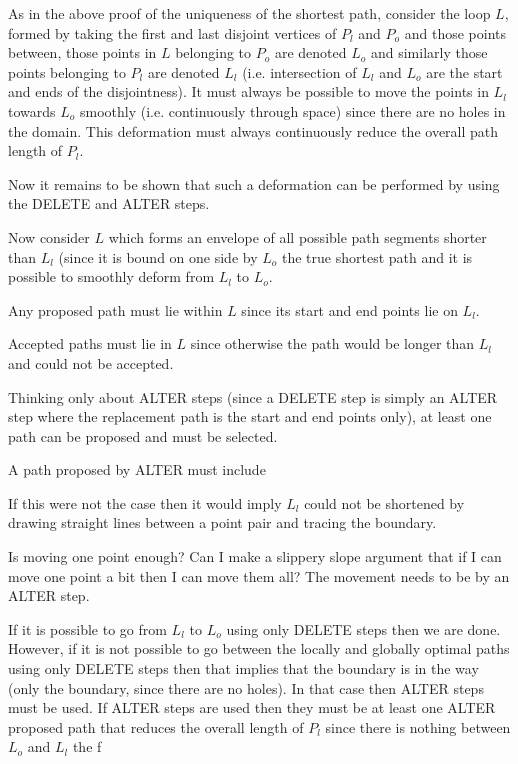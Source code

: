 As in the above proof of the uniqueness of the shortest path, consider the loop $L$, formed by taking the first and last disjoint vertices of $P_l$ and $P_o$ and those points between, those points in $L$ belonging to $P_o$ are denoted $L_o$ and similarly those points belonging to $P_l$ are denoted $L_l$ (i.e. intersection of $L_l$ and $L_o$ are the start and ends of the disjointness). It must always be possible to move the points in $L_l$ towards $L_o$ smoothly (i.e. continuously through space) since there are no holes in the domain. This deformation must always continuously reduce the overall path length of $P_l$.

Now it remains to be shown that such a deformation can be performed by using the DELETE and ALTER steps. 

Now consider $L$ which forms an envelope of all possible path segments shorter than $L_l$ (since it is bound on one side by $L_o$ the true shortest path and it is possible to smoothly deform from $L_l$ to $L_o$. 

Any proposed path must lie within $L$ since its start and end points lie on $L_l$.

Accepted paths must lie in $L$ since otherwise the path would be longer than $L_l$ and could not be accepted.


Thinking only about ALTER steps (since a DELETE step is simply an ALTER step where the replacement path is the start and end points only), at least one path can be proposed and must be selected. 

A path proposed by ALTER must include 

If this were not the case then it would imply $L_l$ could not be shortened by drawing straight lines between a point pair and tracing the boundary. 



Is moving one point enough? Can I make a slippery slope argument that if I can move one point a bit then I can move them all? The movement needs to be by an ALTER step.



If it is possible to go from $L_l$ to $L_o$ using only DELETE steps then we are done. However, if it is not possible to go between the locally and globally optimal paths using only DELETE steps then that implies that the boundary is in the way (only the boundary, since there are no holes).  In that case then ALTER steps must be used. If ALTER steps are used then they must be at least one ALTER proposed path that reduces the overall length of $P_l$ since  there is nothing between $L_o$ and $L_l$ the f

